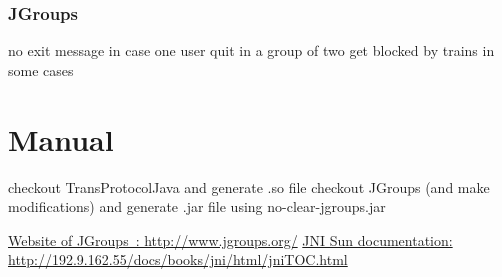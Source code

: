 \documentclass[a4paper,10pt]{report}
\begin{document}
\subsection{JGroups}

no exit message in case one user quit in a group of two
get blocked by trains in some cases

\chapter{Manual}
checkout TransProtocolJava and generate .so file
checkout JGroups (and make modifications) and generate .jar file using no-clear-jgroups.jar

\listoffigures

\begin{thebibliography}{99}
   \href{http://www.jgroups.org/}{Website of JGroups~: http://www.jgroups.org/}
   \href{http://192.9.162.55/docs/books/jni/html/jniTOC.html}{JNI Sun documentation: http://192.9.162.55/docs/books/jni/html/jniTOC.html}
\end{thebibliography}
\end{document}
